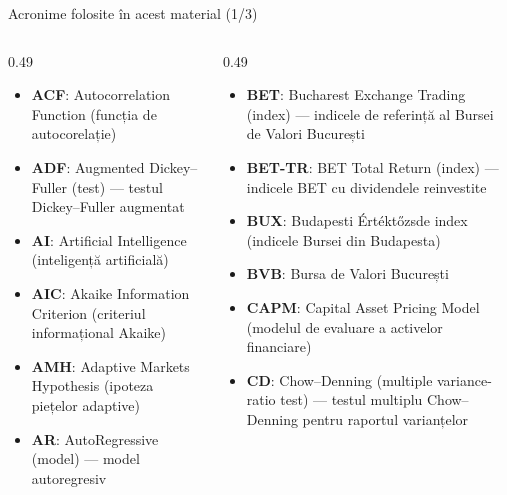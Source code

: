 {
\begin{frame}[noframenumbering]
    \titlepage
\end{frame}
}
\begin{frame}{Acronime folosite în acest material (1/3)}
\begin{columns}[T]
\begin{column}{0.49\textwidth}
\begin{itemize}\setlength{\itemsep}{0pt}
    \item \textbf{ACF}: Autocorrelation Function (funcția de autocorelație)
    \item \textbf{ADF}: Augmented Dickey–Fuller (test) — testul Dickey–Fuller augmentat
    \item \textbf{AI}: Artificial Intelligence (inteligență artificială)
    \item \textbf{AIC}: Akaike Information Criterion (criteriul informațional Akaike)
    \item \textbf{AMH}: Adaptive Markets Hypothesis (ipoteza piețelor adaptive)
    \item \textbf{AR}: AutoRegressive (model) — model autoregresiv
\end{itemize}
\end{column}
\begin{column}{0.49\textwidth}
\begin{itemize}\setlength{\itemsep}{0pt}
    \item \textbf{BET}: Bucharest Exchange Trading (index) — indicele de referință al Bursei de Valori București
    \item \textbf{BET-TR}: BET Total Return (index) — indicele BET cu dividendele reinvestite
    \item \textbf{BUX}: Budapesti Értéktőzsde index (indicele Bursei din Budapesta)
    \item \textbf{BVB}: Bursa de Valori București
    \item \textbf{CAPM}: Capital Asset Pricing Model (modelul de evaluare a activelor financiare)
    \item \textbf{CD}: Chow–Denning (multiple variance-ratio test) — testul multiplu Chow–Denning pentru raportul varianțelor
\end{itemize}
\end{column}
\end{columns}
\end{frame}
